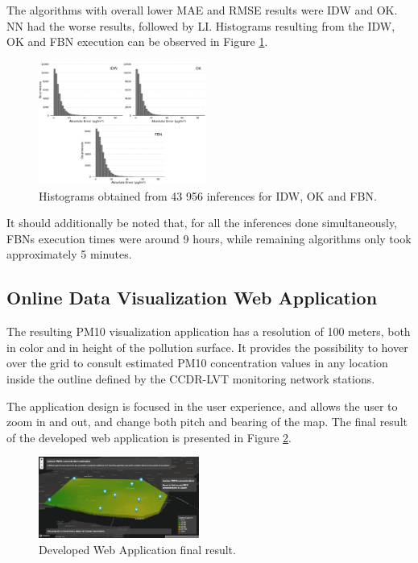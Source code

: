 The algorithms with overall lower MAE and RMSE results were IDW and OK. NN had the worse results, followed by LI. Histograms resulting from the IDW, OK and FBN execution can be observed in Figure \ref{fig:performance-histograms}.

\begin{figure}[ht]
\centering
\includegraphics[width=0.49\textwidth]{./Images/performance-histograms.jpg}
\caption{Histograms obtained from 43 956 inferences for IDW, OK and FBN.}
\label{fig:performance-histograms}
\end{figure}

It should additionally be noted that, for all the inferences done simultaneously, FBNs execution times were around 9 hours, while remaining algorithms only took approximately 5 minutes.

\subsection{Online Data Visualization Web Application}

The resulting PM10 visualization application has a resolution of 100 meters, both in color and in height of the pollution surface. It provides the possibility to hover over the grid to consult estimated PM10 concentration values in any location inside the outline defined by the CCDR-LVT monitoring network stations.

The application design is focused in the user experience, and allows the user to zoom in and out, and change both pitch and bearing of the map. The final result of the developed web application is presented in Figure \ref{fig:developed-visualization}.

\begin{figure}[ht]
\centering
\includegraphics[width=0.47\textwidth]{./Images/developed-visualization.PNG}
\caption{Developed Web Application final result.}
\label{fig:developed-visualization}
\end{figure}

